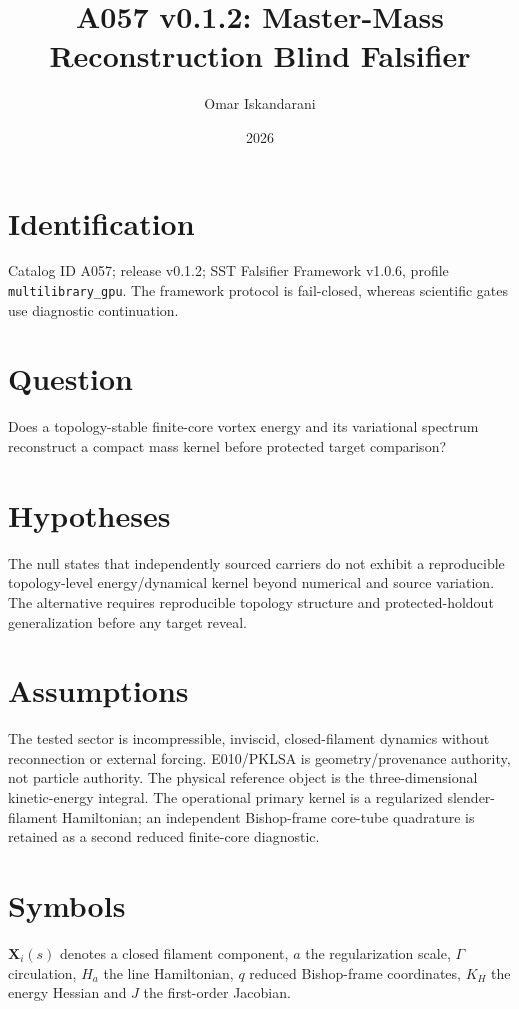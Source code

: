 \documentclass[11pt]{article}
\title{A057 v0.1.2: Master-Mass Reconstruction Blind Falsifier}
\author{Omar Iskandarani}
\date{2026}
\begin{document}
\maketitle

\section{Identification}
Catalog ID A057; release v0.1.2; SST Falsifier Framework v1.0.6, profile \texttt{multilibrary\_gpu}. The framework protocol is fail-closed, whereas scientific gates use diagnostic continuation.

\section{Question}
Does a topology-stable finite-core vortex energy and its variational spectrum reconstruct a compact mass kernel before protected target comparison?

\section{Hypotheses}
The null states that independently sourced carriers do not exhibit a reproducible topology-level energy/dynamical kernel beyond numerical and source variation. The alternative requires reproducible topology structure and protected-holdout generalization before any target reveal.

\section{Assumptions}
The tested sector is incompressible, inviscid, closed-filament dynamics without reconnection or external forcing. E010/PKLSA is geometry/provenance authority, not particle authority. The physical reference object is the three-dimensional kinetic-energy integral. The operational primary kernel is a regularized slender-filament Hamiltonian; an independent Bishop-frame core-tube quadrature is retained as a second reduced finite-core diagnostic.

\section{Symbols}
\(\mathbf X_i(s)\) denotes a closed filament component, \(a\) the regularization scale, \(\Gamma\) circulation, \(H_a\) the line Hamiltonian, \(q\) reduced Bishop-frame coordinates, \(K_H\) the energy Hessian and \(J\) the first-order Jacobian.
\end{document}
